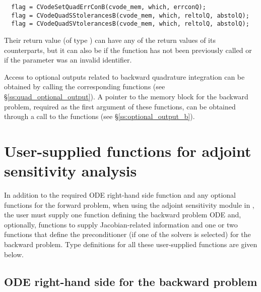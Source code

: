 \begin{verbatim}
  flag = CVodeSetQuadErrConB(cvode_mem, which, errconQ);
  flag = CVodeQuadSStolerancesB(cvode_mem, which, reltolQ, abstolQ);
  flag = CVodeQuadSVtolerancesB(cvode_mem, which, reltolQ, abstolQ);
\end{verbatim}
Their return value  (of type ) can have any of the return values 
of its counterparts, but it can also be  if the function 
 has not been previously called or  if the
parameter  was an invalid identifier.

Access to optional outputs related to backward quadrature integration can be 
obtained by calling the corresponding  functions 
(see \S\ref{ss:quad_optional_output}).  A pointer  to the 
{\cvodes} memory block for the backward problem, required as the first 
argument of these functions, can be obtained through a call to the functions 
 (see \S\ref{ss:optional_output_b}).


\section{User-supplied functions for adjoint sensitivity analysis}
\label{ss:user_fct_adj}

In addition to the required ODE right-hand side function and any optional functions
for the forward problem, when using the adjoint sensitivity module in {\cvodes},
the user must supply one function defining the backward problem ODE and, optionally,
functions to supply Jacobian-related information and one or two functions 
that define the preconditioner (if one of the {\cvspils} solvers is
selected) for the backward problem.
Type definitions for all these user-supplied functions are given below.

\subsection{ODE right-hand side for the backward problem}\label{ss:ODErhs_b}

